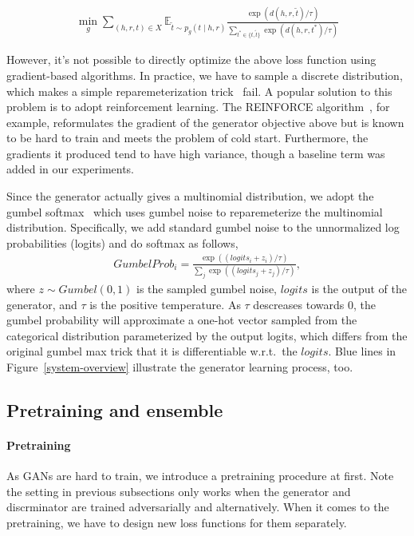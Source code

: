 \documentclass[twocolumn,a4paper,10pt,review,3p]{elsarticle}
\begin{document}
\begin{align*}
    \min_g \sum_{(h, r, t)\in X}
        \mathbb{E}_{\tilde t \sim p_g(t \mid h, r)}
            \frac{\exp(d(h, r, \tilde t) / \tau)}
                 {\sum_{t^* \in \{ t, \tilde t\}} \exp(d(h, r, t^*) / \tau)}
\end{align*}

However, it's not possible to directly optimize the above loss function using gradient-based algorithms. In practice, we have to sample a discrete distribution, which makes a simple reparemeterization trick~\cite{VAE} fail. A popular solution to this problem is to adopt reinforcement learning. The REINFORCE algorithm~\cite{Williams_1992}, for example, reformulates the gradient of the generator objective above but is known to be hard to train and meets the problem of cold start. Furthermore, the gradients it produced tend to have high variance, though a baseline term was added in our experiments.

Since the generator actually gives a multinomial distribution, we adopt the gumbel softmax~\cite{GumbelSoftmax_Jiang_2016} which uses gumbel noise to reparemeterize the multinomial distribution. Specifically, we add standard gumbel noise to the unnormalized log probabilities (logits) and do softmax as follows,
\begin{align*}
    GumbelProb_i = \frac{\exp((logits_i + z_i)/ \tau)}{\sum_{j}\exp((logits_j + z_j)/ \tau)},
\end{align*}
where $z \sim Gumbel(0, 1)$ is the sampled gumbel noise, $logits$ is the output of the generator, and $\tau$ is the positive temperature. As $\tau$ descreases towards 0, the gumbel probability will approximate a one-hot vector sampled from the categorical distribution parameterized by the output logits, which differs from the original gumbel max trick that it is differentiable w.r.t.\ the $logits$. Blue lines in Figure~\ref{system-overview} illustrate the generator learning process, too.


\subsection{Pretraining and ensemble}

\paragraph{Pretraining} As GANs are hard to train, we introduce a pretraining procedure at first. Note the setting in previous subsections only works when the generator and discrminator are trained adversarially and alternatively. When it comes to the pretraining, we have to design new loss functions for them separately.
\end{document}
